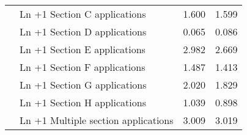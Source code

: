 \begin{tabular}[t]{llrr}
 & Ln +1 Section C applications & \num{1.600} & \num{1.599}\\
 & Ln +1 Section D applications & \num{0.065} & \num{0.086}\\
 & Ln +1 Section E applications & \num{2.982} & \num{2.669}\\
 & Ln +1 Section F applications & \num{1.487} & \num{1.413}\\
 & Ln +1 Section G applications & \num{2.020} & \num{1.829}\\
 & Ln +1 Section H applications & \num{1.039} & \num{0.898}\\
 & Ln +1 Multiple section applications & \num{3.009} & \num{3.019}\\
\bottomrule
\end{tabular}
